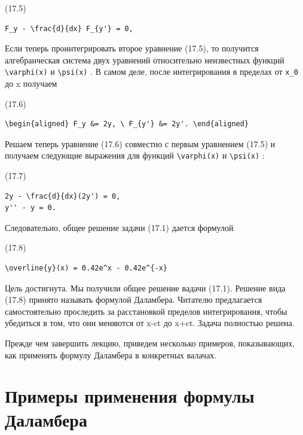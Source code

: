 \documentclass[
  ukrainian,
]{article}
\begin{document}
(17.5)

\begin{verbatim}
F_y - \frac{d}{dx} F_{y'} = 0,
\end{verbatim}

Если теперь проинтегрировать второе уравнение (17.5), то получится
алгебранческая система двух уравнений относительно неизвестных функций
\texttt{\textbackslash{}varphi(x)} и \texttt{\textbackslash{}psi(x)} . В
самом деле, после интегрирования в пределах от \texttt{x\_0} до x
получаем

(17.6)

\begin{verbatim}
\begin{aligned} F_y &= 2y, \ F_{y'} &= 2y'. \end{aligned}
\end{verbatim}

Решаем теперь уравнение (17.6) совместно с первым уравнением (17.5) и
получаем следующие выражения для функций
\texttt{\textbackslash{}varphi(x)} и \texttt{\textbackslash{}psi(x)} :

(17.7)

\begin{verbatim}
2y - \frac{d}{dx}(2y') = 0,
y'' - y = 0.
\end{verbatim}

Следовательно, общее решение задачи (17.1) дается формулой

(17.8)

\begin{verbatim}
\overline{y}(x) = 0.42e^x - 0.42e^{-x}
\end{verbatim}

Цель достигнута. Мы получили общее решение вадачи (17.1). Решение вида
(17.8) принято называть формулой Даламбера. Читателю предлагается
самостоятельно проследить за расстановкой пределов интегрирования, чтобы
убедиться в том, что они меняются от x-ct до x+ct. Задача полностью
решена.

Прежде чем завершить лекцию, приведем несколько примеров, показывающих,
как применять формулу Даламбера в конкретных валачах.

\section{Примеры применения формулы
Даламбера}\label{ux43fux440ux438ux43cux435ux440ux44b-ux43fux440ux438ux43cux435ux43dux435ux43dux438ux44f-ux444ux43eux440ux43cux443ux43bux44b-ux434ux430ux43bux430ux43cux431ux435ux440ux430}
\end{document}
